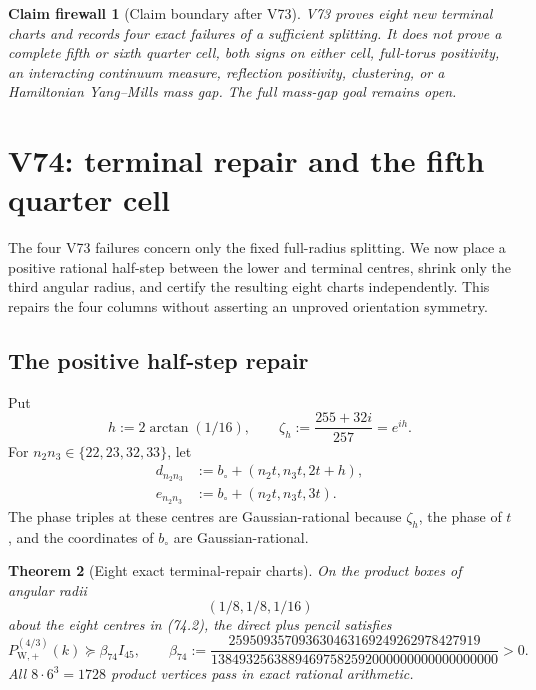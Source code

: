 \documentclass[11pt,oneside]{article}
\newtheorem{theorem}{Theorem}[section]
\newtheorem{firewall}[theorem]{Claim firewall}
\theoremstyle{definition}
\theoremstyle{remark}
\begin{document}
\begin{firewall}[Claim boundary after V73]
\label{fire:newv73-final}
V73 proves eight new terminal charts and records four exact failures
of a sufficient splitting.  It does not prove a complete fifth or
sixth quarter cell, both signs on either cell, full-torus
positivity, an interacting continuum measure, reflection
positivity, clustering, or a Hamiltonian Yang--Mills mass gap.  The
full mass-gap goal remains open.
\end{firewall}

\section{V74: terminal repair and the fifth quarter cell}
\label{sec:newv74-fifth-cell}

The four V73 failures concern only the fixed full-radius splitting.
We now place a positive rational half-step between the lower and
terminal centres, shrink only the third angular radius, and certify
the resulting eight charts independently.  This repairs the four
columns without asserting an unproved orientation symmetry.

\subsection{The positive half-step repair}

Put
\[
 h:=2\arctan(1/16),\qquad
 \zeta_h:=\frac{255+32i}{257}=e^{ih}.                    \tag{74.1}
\]
For \(n_2n_3\in\{22,23,32,33\}\), let
\[
\begin{aligned}
 d_{n_2n_3}
   &:=b_\circ+(n_2t,n_3t,2t+h),\\
 e_{n_2n_3}
   &:=b_\circ+(n_2t,n_3t,3t).
\end{aligned}                                          \tag{74.2}
\]
The phase triples at these centres are Gaussian-rational because
\(\zeta_h\), the phase of \(t\), and the coordinates of \(b_\circ\)
are Gaussian-rational.

\begin{theorem}[Eight exact terminal-repair charts]
\label{thm:newv74-repair}
On the product boxes of angular radii
\[
 (1/8,1/8,1/16)                                        \tag{74.3}
\]
about the eight centres in (74.2), the direct plus pencil satisfies
\[
 P_{\mathrm W,+}^{(4/3)}(k)
 \succeq\beta_{74}I_{45},\qquad
 \beta_{74}:=
 \frac{259509357093630463169249262978427919}
 {13849325638894697582592000000000000000000}>0.        \tag{74.4}
\]
All \(8\cdot6^3=1728\) product vertices pass in exact rational
arithmetic.
\end{theorem}
\end{document}
